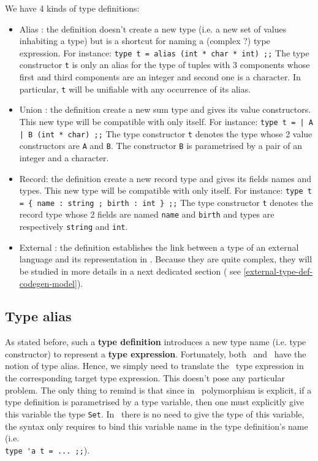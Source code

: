 We have 4 kinds of type definitions:
\begin{itemize}
  \item Alias : the definition doesn't create a new type (i.e. a new
    set of values inhabiting a type) but is a shortcut for naming a
    (complex ?) type expression. For instance:
    {\footnotesize\lstinline!type t = alias (int * char * int) ;;!}
    The type constructor {\tt t} is only an alias for the type of
    tuples with 3 components whose first and third components are an
    integer and second one is a character. In particular, {\tt t} will
    be unifiable with any occurrence of its alias. 
  \item Union : the definition create a new sum type and gives its
    value constructors. This new type will be compatible with only
    itself. For instance:
    {\footnotesize\lstinline!type t = | A | B (int * char) ;;!}
    The type constructor {\tt t} denotes the type whose 2 value
    constructors are {\tt A} and {\tt B}. The constructor {\tt B} is
    parametrised by a pair of an integer and a character.
  \item Record: the definition create a new record type and gives its
    fields names and types. This new type will be compatible with only
    itself. For instance:
    {\footnotesize\lstinline!type t = { name : string ; birth : int } ;;!}
    The type constructor {\tt t} denotes the record type whose 2
    fields are named {\tt name} and {\tt birth} and types are
    respectively {\tt string} and {\tt int}.
  \item External : the definition establishes the link between a type
    of an external language and its representation in
    \focalize. Because they are quite complex, they will be studied in
    more details in a next dedicated section (
    see \ref{external-type-def-codegen-model}).
\end{itemize}


\subsection{Type alias}
As stated before, such a {\bf type definition} introduces a new type
name (i.e. type constructor) to represent a
{\bf type expression}. Fortunately, both \ocaml\ and \coq\ have the
notion of type alias. Hence, we simply need to translate the
\focalize\ type expression in the corresponding target type
expression. This doesn't pose any particular problem. The only thing
to remind is that since in \coq\ polymorphism is explicit, if a type
definition is parametrised by a type variable, then one must
explicitly give this variable the type {\tt Set}. In \ocaml\, there
is no need to give the type of this variable, the syntax only requires
to bind this variable name in the type definition's name (i.e. \\
\lstinline!type 'a t = ... ;;!).

